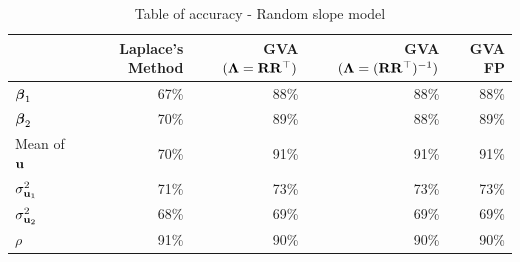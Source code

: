 \documentclass{amsart}[12pt]
\begin{document}
	\begin{table}
		\caption{Table of accuracy - Random slope model}
		\label{tab:accuracy_slope}
		\begin{tabular}{|l|rrrr|}
			\hline
			                   & Laplace's Method & GVA $({\boldsymbol \Lambda} = {\bf R} {\bf R}^\top)$ & GVA $({\boldsymbol \Lambda} = ({\bf R} {\bf R}^\top)^{-1})$ & GVA FP \\
			\hline
			${\boldsymbol \beta}_1$         & 67\%             & 88\%                            & 88\%                                   & 88\%   \\
			${\boldsymbol \beta}_2$         & 70\%             & 89\%                            & 88\%                                   & 89\%   \\
			Mean of ${\bf u}$      & 70\%             & 91\%                            & 91\%                                   & 91\%   \\
			$\sigma^2_{{\bf u}_1}$ & 71\%           & 73\%                          & 73\%                                 & 73\% \\
			$\sigma^2_{{\bf u}_2}$ & 68\%           & 69\%                          & 69\%                                 & 69\% \\
			$\rho$             & 91\%             & 90\%                            & 90\%                                   & 90\%   \\
			\hline
		\end{tabular}
	\end{table}
		
		
\end{document}
